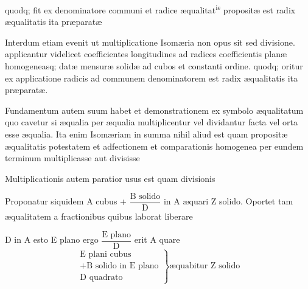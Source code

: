 \documentclass[11pt,a4paper]{article}
\begin{document}
quodq; fit ex denominatore communi et radice æqualitat\textsuperscript{is} propositæ est radix æqualitatis ita præparatæ

Interdum etiam evenit ut multiplicatione Isomæria non opus sit sed divisione. applicantur videlicet coefficientes longitudines ad radices coefficientis planæ homogeneasq; datæ mensuræ solidæ ad cubos et constanti ordine. quodq; oritur ex applicatione radicis ad communem denominatorem est radix æqualitatis ita præparatæ.

Fundamentum autem suum habet et demonstrationem ex symbolo æqualitatum quo cavetur si æqualia per æqualia  multiplicentur vel dividantur facta vel orta esse æqualia. Ita enim  Isomæriam in summa nihil aliud est quam propositæ æqualitatis potestatem et adfectionem et comparationis homogenea per eundem terminum multiplicasse aut divisisse

Multiplicationis autem paratior usus est quam divisionis

Proponatur siquidem A cubus + $\dfrac{\text{B solido}}{\text{D}}$ in A æquari Z solido. Oportet tam æqualitatem a fractionibus quibus laborat liberare

D in A esto E plano ergo $\dfrac{\text{E plano}}{\text{D}}$ erit A quare
\[ \left.\begin{array}{l} \text{E plani cubus} \\ +\text{B solido in E plano} \\ \hline \text{D quadrato} \end{array}\right\} \text{æquabitur Z solido} \]
\end{document}
